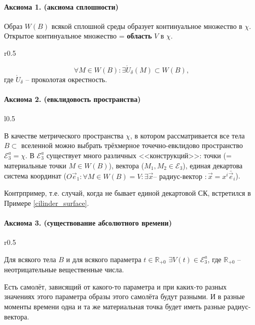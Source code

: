 \paragraph{Аксиома 1. (аксиома сплошности)} Образ $W(B)$ всякой сплошной среды образует континуальное
множество в $\chi$. Открытое континуальное множество = \textbf{область} $V$ в $\chi$.

\begin{wrapfigure}{r}{0.5\textwidth}
	\centering
	
\end{wrapfigure}

\[
  \forall M \in W(B) : \exists \mathring{U}_\delta (M) \subset W(B),
\]
где $\mathring{U}_\delta$ -- проколотая окрестность.
\vspace{45pt}

\paragraph{Аксиома 2. (евклидовость пространства)} 
\begin{wrapfigure}{l}{0.5\textwidth}
	\centering
	
\end{wrapfigure}
В качестве метрического пространства $\chi$,
в котором рассматривается все тела $B \subset$ вселенной можно выбрать трёхмерное 
точечно-евклидово пространство $\mathcal{E}^a_3 = \chi$. В $\mathcal{E}_3^a$ существует много различных <<конструкций>>: точки (= материальные точки
$M \in W(B)$), вектора ($M_1, M_2 \in \mathcal{E}_3$), единая декартова система координат
($O\vec{e}_1 : \forall M \in W(B)=V : \exists \vec{x} \text{-- радиус-вектор } :
\vec{x} = x^i \bar{\vec{e}}_i$).

Контрпример, т.е. случай, когда не бывает единой декартовой СК, встретился в Примере \ref{cilinder_surface}.

\paragraph{Аксиома 3. (существование абсолютного времени)} 
\begin{wrapfigure}{r}{0.5\textwidth}
	\centering
	
\end{wrapfigure}
Для всякого тела $B$ и для всякого
параметра $t \in \mathbb{R}_{+0}$ $\exists V(t) \in \mathcal{E}_3^a$, где $\mathbb{R}_{+0}$ --
неотрицательные вещественные числа.

Есть самолёт, зависящий от какого-то параметра и при каких-то разных значениях этого параметра 
образы этого самолёта будут разными. И в разные моменты времени одна и та же материальная точка
будет иметь разные радиус-вектора.


